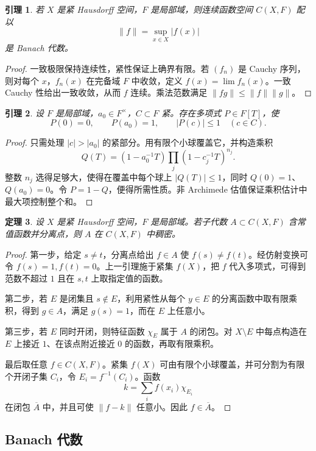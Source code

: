 \documentclass[11pt,a4paper,openany]{ctexbook}
\numberwithin{equation}{chapter}
\theoremstyle{plain}
\newtheorem{theorem}{定理}[chapter]
\newtheorem{lemma}[theorem]{引理}
\theoremstyle{definition}
\theoremstyle{remark}
\begin{document}
\begin{lemma}
若 $X$ 是紧 Hausdorff 空间，$F$ 是局部域，则连续函数空间 $C(X,F)$ 配以
\[
  \|f\|=\sup_{x\in X}|f(x)|
\]
是 Banach 代数。
\end{lemma}

\begin{proof}
一致极限保持连续性，紧性保证上确界有限。若 $(f_n)$ 是 Cauchy 序列，则对每个 $x$，$f_n(x)$ 在完备域 $F$ 中收敛，定义 $f(x)=\lim f_n(x)$。一致 Cauchy 性给出一致收敛，从而 $f$ 连续。乘法范数满足 $\|fg\|\le\|f\|\|g\|$。
\end{proof}

\begin{lemma}
设 $F$ 是局部域，$a_0\in F^\times$，$C\subset F$ 紧。存在多项式 $P\in F[T]$，使
\[
  P(0)=0,\qquad P(a_0)=1,\qquad |P(c)|\le1\quad(c\in C).
\]
\end{lemma}

\begin{proof}
只需处理 $|c|>|a_0|$ 的紧部分。用有限个小球覆盖它，并构造乘积
\[
  Q(T)=(1-a_0^{-1}T)\prod_j(1-c_j^{-1}T)^{n_j}.
\]
整数 $n_j$ 选得足够大，使得在覆盖中每个球上 $|Q(T)|\le1$，同时 $Q(0)=1$、$Q(a_0)=0$。令 $P=1-Q$，便得所需性质。非 Archimede 估值保证乘积估计中最大项控制整个和。
\end{proof}

\begin{theorem}
设 $X$ 是紧 Hausdorff 空间，$F$ 是局部域。若子代数 $A\subset C(X,F)$ 含常值函数并分离点，则 $A$ 在 $C(X,F)$ 中稠密。
\end{theorem}

\begin{proof}
第一步，给定 $s\ne t$，分离点给出 $f\in A$ 使 $f(s)\ne f(t)$。经仿射变换可令 $f(s)=1,f(t)=0$。上一引理施于紧集 $f(X)$，把 $f$ 代入多项式，可得到范数不超过 $1$ 且在 $s,t$ 上取指定值的函数。

第二步，若 $E$ 是闭集且 $s\notin E$，利用紧性从每个 $y\in E$ 的分离函数中取有限乘积，得到 $g\in A$，满足 $g(s)=1$，而在 $E$ 上任意小。

第三步，若 $E$ 同时开闭，则特征函数 $\chi_E$ 属于 $A$ 的闭包。对 $X\setminus E$ 中每点构造在 $E$ 上接近 $1$、在该点附近接近 $0$ 的函数，再取有限乘积。

最后取任意 $f\in C(X,F)$。紧集 $f(X)$ 可由有限个小球覆盖，并可分割为有限个开闭子集 $C_i$，令 $E_i=f^{-1}(C_i)$。函数
\[
  k=\sum_i f(x_i)\chi_{E_i}
\]
在闭包 $\overline A$ 中，并且可使 $\|f-k\|$ 任意小。因此 $f\in\overline A$。
\end{proof}

\subsection{Banach 代数}
\end{document}

